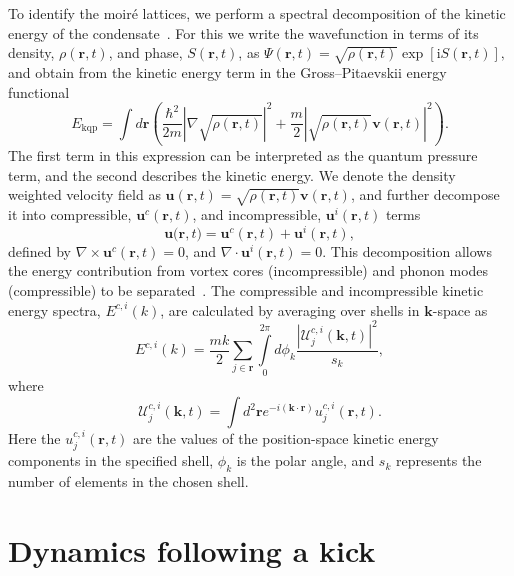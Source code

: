 To identify the moir\'e lattices, we perform a spectral decomposition of the kinetic energy of the condensate~\cite{CT:Nore_prl_1997,CT:Nore_pof_1997,CT:Bradley_prx_2012}. For this we write the wavefunction in terms of its density, $\rho(\mathbf{r},t)$, and
phase, $S(\mathbf{r},t)$, as
$
		\Psi(\mathbf{r},t) = \sqrt{\rho(\mathbf{r},t)}\exp{\left[\mathrm{i}S(\mathbf{r},t)\right]},
$
and obtain from the kinetic energy term in the Gross--Pitaevskii energy functional
	\begin{equation}
		E_{\text{kqp}} = \int d\mathbf{r} \left( \frac{\hbar^2}{2m}| \nabla\sqrt{\rho(\mathbf{r},t)} |^2  + \frac{m}{2}|\sqrt{\rho(\mathbf{r},t)}\mathbf{v}(\mathbf{r},t) |^2\right).
	\end{equation}
The first term in this expression can be interpreted as the quantum pressure term, and
the second describes the kinetic energy. We denote the density weighted velocity field as $\mathbf{u}(\mathbf{r},t) = \sqrt{\rho(\mathbf{r},t)}\mathbf{v}(\mathbf{r},t)$, and further decompose it into compressible, $\mathbf{u}^c(\mathbf{r},t)$, and incompressible, $\mathbf{u}^i(\mathbf{r},t)$ terms
	\begin{equation}
		\mathbf{u(r},t) = \mathbf{u}^c(\mathbf{r},t) + \mathbf{u}^i(\mathbf{r},t),
	\end{equation}
defined by $\nabla \times \mathbf{u}^c(\mathbf{r},t) = 0$, and $\nabla \cdot \mathbf{u}^i(\mathbf{r},t) = 0$. This decomposition allows the energy contribution from vortex cores (incompressible) and phonon modes (compressible) to be separated~\cite{CT:Horng_pra_2009}. The compressible and incompressible kinetic energy spectra, $E^{c,i}(k)$, are calculated by averaging over shells in $\mathbf{k}$-space as~\cite{CT:Bradley_prx_2012}
	\begin{equation}
		E^{c,i}(k) = \frac{mk}{2}\sum\limits_{j\in\mathbf{r}} \int\limits_{0}^{2\pi}d\phi_k \frac{ |\mathcal{U}_j^{c,i}(\mathbf{k},t) |^2}{s_k},
	\end{equation}
	where
	\begin{equation}
		\mathcal{U}_j^{c,i}(\mathbf{k},t) = \int d^2 \mathbf{r} e^{-i(\mathbf{k}\cdot\mathbf{r})} u_j^{c,i}(\mathbf{r},t).
	\end{equation}
	Here the $u_j^{c,i}(\mathbf{r},t)$ are the values of the position-space kinetic energy components in the specified shell, $\phi_k$ is the polar angle, and $s_k$ represents the number of elements in the chosen shell.

    \section{Dynamics following a kick}\label{sec:kickvl}
